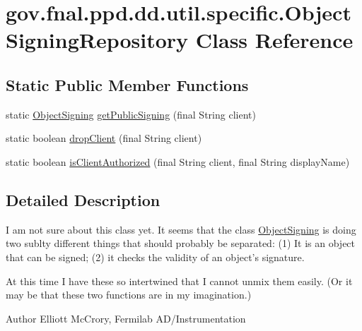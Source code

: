 \hypertarget{classgov_1_1fnal_1_1ppd_1_1dd_1_1util_1_1specific_1_1ObjectSigningRepository}{\section{gov.\-fnal.\-ppd.\-dd.\-util.\-specific.\-Object\-Signing\-Repository Class Reference}
\label{classgov_1_1fnal_1_1ppd_1_1dd_1_1util_1_1specific_1_1ObjectSigningRepository}
}
\subsection*{Static Public Member Functions}
\begin{DoxyCompactItemize}
\item 
static \hyperlink{classgov_1_1fnal_1_1ppd_1_1dd_1_1util_1_1specific_1_1ObjectSigning}{Object\-Signing} \hyperlink{classgov_1_1fnal_1_1ppd_1_1dd_1_1util_1_1specific_1_1ObjectSigningRepository_a5b1c846be39df313c60ca26183a89027}{get\-Public\-Signing} (final String client)
\item 
static boolean \hyperlink{classgov_1_1fnal_1_1ppd_1_1dd_1_1util_1_1specific_1_1ObjectSigningRepository_aaa4803138869f8eb5ff005c8fa6ca820}{drop\-Client} (final String client)
\item 
static boolean \hyperlink{classgov_1_1fnal_1_1ppd_1_1dd_1_1util_1_1specific_1_1ObjectSigningRepository_a222eaa12e64386f9d0712169468b6412}{is\-Client\-Authorized} (final String client, final String display\-Name)
\end{DoxyCompactItemize}


\subsection{Detailed Description}
I am not sure about this class yet. It seems that the class \hyperlink{classgov_1_1fnal_1_1ppd_1_1dd_1_1util_1_1specific_1_1ObjectSigning}{Object\-Signing} is doing two sublty different things that should probably be separated\-: (1) It is an object that can be signed; (2) it checks the validity of an object's signature. 

At this time I have these so intertwined that I cannot unmix them easily. (Or it may be that these two functions are in my imagination.) 

\begin{DoxyAuthor}{Author}
Elliott Mc\-Crory, Fermilab A\-D/\-Instrumentation 
\end{DoxyAuthor}


